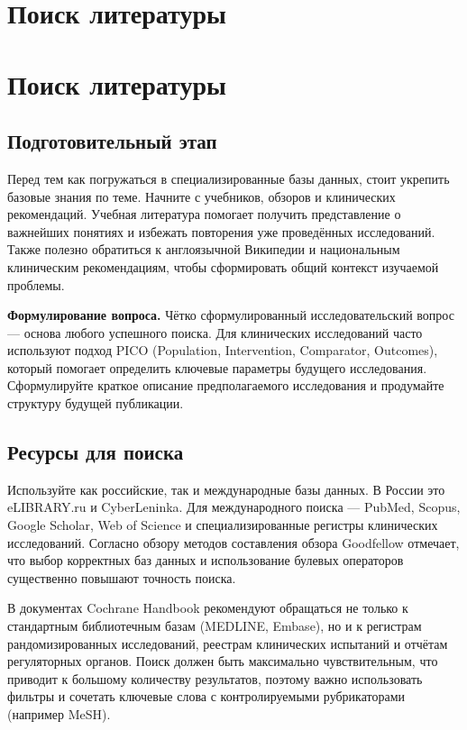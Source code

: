 \documentclass[
  russian,
  12pt,
  a4paper,
]{article}
\begin{document}
\chapter{Поиск
литературы}\label{ux43fux43eux438ux441ux43a-ux43bux438ux442ux435ux440ux430ux442ux443ux440ux44b}

\chapter{Поиск литературы}\label{sec-literature_search}

\section{Подготовительный
этап}\label{ux43fux43eux434ux433ux43eux442ux43eux432ux438ux442ux435ux43bux44cux43dux44bux439-ux44dux442ux430ux43f}

Перед тем как погружаться в специализированные базы данных, стоит
укрепить базовые знания по теме. Начните с учебников, обзоров и
клинических рекомендаций. Учебная литература помогает получить
представление о важнейших понятиях и избежать повторения уже проведённых
исследований. Также полезно обратиться к англоязычной Википедии и
национальным клиническим рекомендациям, чтобы сформировать общий
контекст изучаемой проблемы.

\textbf{Формулирование вопроса.} Чётко сформулированный
исследовательский вопрос --- основа любого успешного поиска. Для
клинических исследований часто используют подход PICO (Population,
Intervention, Comparator, Outcomes), который помогает определить
ключевые параметры будущего исследования. Сформулируйте краткое описание
предполагаемого исследования и продумайте структуру будущей публикации.

\section{Ресурсы для
поиска}\label{ux440ux435ux441ux443ux440ux441ux44b-ux434ux43bux44f-ux43fux43eux438ux441ux43aux430}

Используйте как российские, так и международные базы данных. В России
это eLIBRARY.ru и CyberLeninka. Для международного поиска --- PubMed,
Scopus, Google Scholar, Web of Science и специализированные регистры
клинических исследований. Согласно обзору методов составления обзора
Goodfellow отмечает, что выбор корректных баз данных и использование
булевых операторов существенно повышают точность поиска.

В документах Cochrane Handbook рекомендуют обращаться не только к
стандартным библиотечным базам (MEDLINE, Embase), но и к регистрам
рандомизированных исследований, реестрам клинических испытаний и отчётам
регуляторных органов. Поиск должен быть максимально чувствительным, что
приводит к большому количеству результатов, поэтому важно использовать
фильтры и сочетать ключевые слова с контролируемыми рубрикаторами
(например MeSH).
\end{document}
